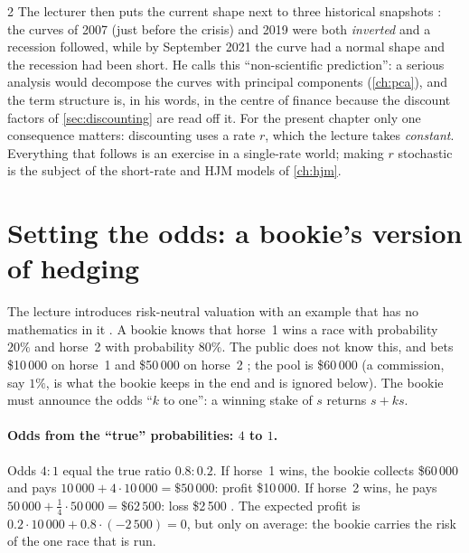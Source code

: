 \begin{paracol}{2}
The lecturer then puts the current shape next to three historical snapshots : the
curves of 2007 (just before the crisis) and 2019 were both \emph{inverted} and a recession followed, while by
September 2021 the curve had a normal shape and the recession had been short. He calls this ``non-scientific
prediction'': a serious analysis would decompose the curves with principal components (\cref{ch:pca}), and the
term structure is, in his words, in the centre of finance because the discount factors of \cref{sec:discounting}
are read off it. For the present chapter only one consequence matters: discounting uses a rate $r$, which the
lecture takes \emph{constant}. Everything that follows is an exercise in a single-rate world; making $r$ stochastic
is the subject of the short-rate and HJM models of \cref{ch:hjm}.

\section{Setting the odds: a bookie's version of hedging}\label{ch15:sec-bookie}
The lecture introduces risk-neutral valuation with an example that has no mathematics in it
. A bookie knows that horse~1 wins a race with probability $20\%$ and horse~2 with
probability $80\%$. The public does not know this, and bets \$10\,000 on horse~1 and \$50\,000 on horse~2
; the pool is \$60\,000 (a commission, say $1\%$, is what the bookie keeps in
the end and is ignored below). The bookie must announce the odds ``$k$ to one'': a winning stake of $s$ returns
$s+ks$.

\paragraph{Odds from the ``true'' probabilities: $4$ to $1$.} Odds $4:1$ equal the true ratio $0.8:0.2$. If horse~1
wins, the bookie collects \$60\,000 and pays $10\,000+4\cdot10\,000=\$50\,000$: profit \$10\,000. If horse~2 wins, he pays
$50\,000+\tfrac14\cdot50\,000=\$62\,500$: loss \$2\,500 . The expected profit is
$0.2\cdot10\,000+0.8\cdot(-2\,500)=0$, but only on average: the bookie carries the risk of the one race that is run.


\end{paracol}
